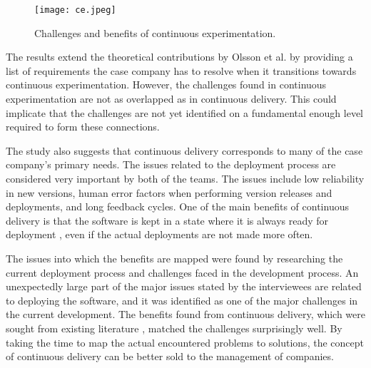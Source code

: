 \documentclass[english]{tktltiki2}
\theoremstyle{definition}
\theoremstyle{remark}
\begin{document}
\begin{figure}[!htb]
	\centering
	\texttt{[image: ce.jpeg]}
	\caption{Challenges and benefits of continuous experimentation.}
	\label{fig9}
\end{figure}

The results extend the theoretical contributions by Olsson et al. \cite{olsson2012climbing} by providing a list of requirements the case company has to resolve when it transitions towards continuous experimentation. However, the challenges found in continuous experimentation are not as overlapped as in continuous delivery. This could implicate that the challenges are not yet identified on a fundamental enough level required to form these connections.








The study also suggests that continuous delivery corresponds to many of the case company's primary needs. The issues related to the deployment process are considered very important by both of the teams. The issues include low reliability in new versions, human error factors when performing version releases and deployments, and long feedback cycles. One of the main benefits of continuous delivery is that the software is kept in a state where it is always ready for deployment \cite{cdbook}, even if the actual deployments are not made more often. 

The issues into which the benefits are mapped were found by researching the current deployment process and challenges faced in the development process. An unexpectedly large part of the major issues stated by the interviewees are related to deploying the software, and it was identified as one of the major challenges in the current development. The benefits found from continuous delivery, which were sought from existing literature \cite{cdbook, neely2013continuous, humble2006deployment}, matched the challenges surprisingly well. By taking the time to map the actual encountered problems to solutions, the concept of continuous delivery can be better sold to the management of companies.
\end{document}
